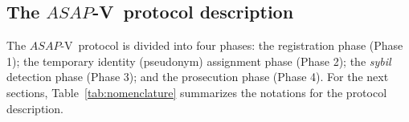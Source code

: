 \documentclass[preprint,12pt]{elsarticle}
\newcommand{\protocolname}{$ASAP$-V}
\begin{document}
\subsection{The \protocolname~protocol description}


The \protocolname~protocol is divided into four phases: the registration phase (Phase 1); the temporary identity (pseudonym) assignment phase (Phase 2); the \textit{sybil} detection phase (Phase 3); and the prosecution phase (Phase 4). For the next sections, Table~\ref{tab:nomenclature} summarizes the notations for the protocol description.
\end{document}
